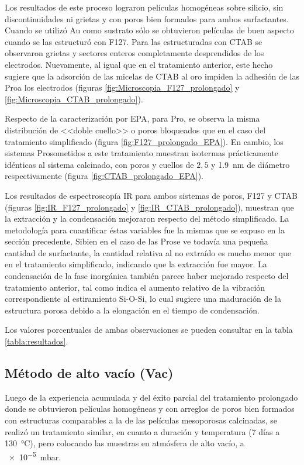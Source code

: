 	 	 Los resultados de este proceso lograron películas homogéneas sobre silicio, sin discontinuidades ni grietas y con poros bien formados para ambos surfactantes. Cuando se utilizó Au como sustrato sólo se obtuvieron películas de buen aspecto cuando se las estructuró con F127. Para las estructuradas con CTAB se observaron grietas y sectores enteros completamente desprendidos de los electrodos. Nuevamente, al igual que en el tratamiento anterior, este hecho sugiere que la adsorción de las micelas de CTAB al oro impiden la adhesión de las Pro\pdmC\space a los electrodos (figuras \ref{fig:Microscopia_F127_prolongado} y \ref{fig:Microscopia_CTAB_prolongado}).

	 	 Respecto de la caracterización por EPA, para Pro\pdmF, se observa la misma distribución de <<doble cuello>> o poros bloqueados que en el caso del tratamiento simplificado (figura \ref{fig:F127_prolongado_EPA}). En cambio, los sistemas Pro\pdmC\space sometidos a este tratamiento muestran isotermas prácticamente idénticas al sistema calcinado, con poros y cuellos de $2,5$ y \SI{1,9}{\nm} de diámetro respectivamente (figura \ref{fig:CTAB_prolongado_EPA}).

	 	 Los resultados de espectroscopía IR para ambos sistemas de poros, F127 y CTAB (figuras \ref{fig:IR_F127_prolongado} y \ref{fig:IR_CTAB_prolongado}), muestran que la extracción y la condensación mejoraron respecto del método simplificado. La metodología para cuantificar éstas variables fue la mismas que se expuso en la sección precedente. Si\space bien en el caso de las Pro\pdmC\space se ve todavía una pequeña cantidad de surfactante, la cantidad relativa al no extraído es mucho menor que en el tratamiento simplificado, indicando que la extracción fue mayor. La condensación de la fase inorgánica también parece haber mejorado respecto del tratamiento anterior, tal como indica el aumento relativo de la vibración correspondiente al estiramiento Si-O-Si, lo cual sugiere una maduración de la estructura porosa debido a la elongación en el tiempo de condensación. 

	 	 Los valores porcentuales de ambas observaciones se pueden consultar en la tabla \ref{tabla:resultados}.

	 \subsection{Método de alto vacío (Vac)}\label{sec:trat-vacio}

	     Luego de la experiencia acumulada y del éxito parcial del tratamiento prolongado donde se obtuvieron películas homogéneas y con arreglos de poros bien formados con estructuras comparables a la de las películas mesoporosas calcinadas\cite{Mogilnikov2002,Fuertes2008,Rothen1945}, se realizó un tratamiento similar, en cuanto a duración y temperatura (7 días a \SI{130}{\celsius}), pero colocando las muestras en atmósfera de alto vacío, a \SI{e-5}{\milli\bar}.

